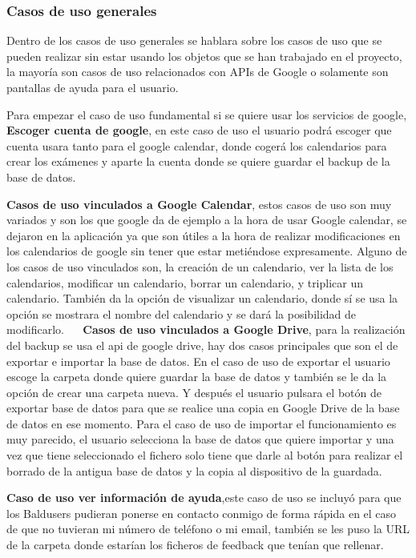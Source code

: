 \subsubsection{Casos de uso generales}
\label{subsubsecc:Casos de uso generales}

Dentro de los casos de uso generales se hablara sobre los casos de uso que se pueden realizar sin estar usando los objetos que se han trabajado en el proyecto, la mayoría son casos de uso relacionados con APIs de Google o solamente son pantallas de ayuda para el usuario.

Para empezar el caso de uso fundamental si se quiere usar los servicios de google, \textbf{Escoger cuenta de google}, en este caso de uso el usuario podrá escoger que cuenta usara tanto para el google calendar, donde cogerá los calendarios para crear los exámenes y aparte la cuenta donde se quiere guardar el backup de la base de datos.

\textbf{Casos de uso vinculados a Google Calendar}, estos casos de uso son muy variados y son los que google da de ejemplo a la hora de usar Google calendar, se dejaron en la aplicación ya que son útiles a la hora de realizar modificaciones en los calendarios de google sin tener que estar metiéndose expresamente.
Alguno de los casos de uso vinculados son, la creación de un calendario, ver la lista de los calendarios, modificar un calendario, borrar un calendario, y triplicar un calendario. También da la opción de visualizar un calendario, donde sí se usa la opción se mostrara el nombre del calendario y se dará la posibilidad de modificarlo.
 
\textbf{Casos de uso vinculados a Google Drive}, para la realización del backup se usa el api de google drive, hay dos casos principales que son el de exportar e importar la base de datos.
En el caso de uso de exportar el usuario escoge la carpeta donde quiere guardar la base de datos y también se le da la opción de crear una carpeta nueva.
Y después el usuario pulsara el botón de exportar base de datos para que se realice una copia en Google Drive de la base de datos en ese momento.
Para el caso de uso de importar el funcionamiento es muy parecido, el usuario selecciona la base de datos que quiere importar y una vez que tiene seleccionado el fichero solo tiene que darle al botón para realizar el borrado de la antigua base de datos y la copia al dispositivo de la guardada.

\textbf{Caso de uso ver información de ayuda},este caso de uso se incluyó para que los Baldusers pudieran ponerse en contacto conmigo de forma rápida en el caso de que no tuvieran mi número de teléfono o mi email, también se les puso la URL de la carpeta donde estarían los ficheros de feedback que tenían que rellenar.

